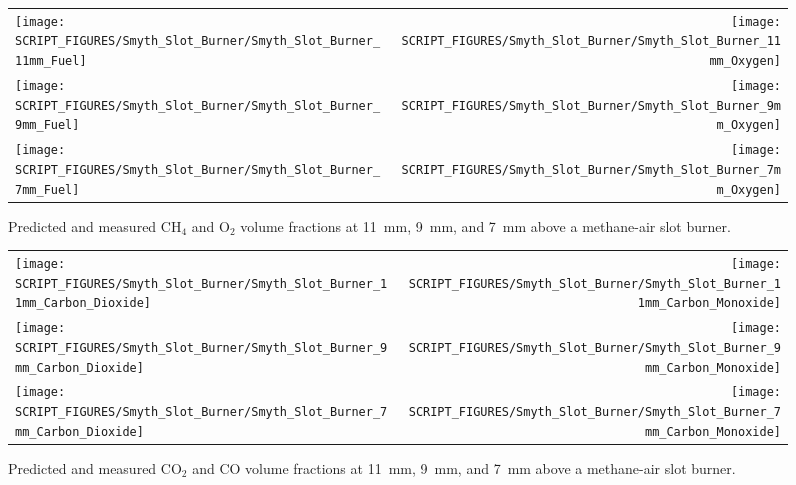 \begin{figure}[p]
\begin{tabular*}{\textwidth}{l@{\extracolsep{\fill}}r}
\texttt{[image: SCRIPT\_FIGURES/Smyth\_Slot\_Burner/Smyth\_Slot\_Burner\_11mm\_Fuel]} &
\texttt{[image: SCRIPT\_FIGURES/Smyth\_Slot\_Burner/Smyth\_Slot\_Burner\_11mm\_Oxygen]} \\
\texttt{[image: SCRIPT\_FIGURES/Smyth\_Slot\_Burner/Smyth\_Slot\_Burner\_9mm\_Fuel]} &
\texttt{[image: SCRIPT\_FIGURES/Smyth\_Slot\_Burner/Smyth\_Slot\_Burner\_9mm\_Oxygen]} \\
\texttt{[image: SCRIPT\_FIGURES/Smyth\_Slot\_Burner/Smyth\_Slot\_Burner\_7mm\_Fuel]} &
\texttt{[image: SCRIPT\_FIGURES/Smyth\_Slot\_Burner/Smyth\_Slot\_Burner\_7mm\_Oxygen]}
\end{tabular*}
\caption[CH$_4$ and O$_2$ volume fractions at 11~mm, 9~mm, and 7~mm above burner, Smyth burner]
{Predicted and measured CH$_4$ and O$_2$ volume fractions at 11~mm, 9~mm, and 7~mm above a methane-air slot burner.}
\label{Smyth_Slot_Burner_fuel_ox}
\end{figure}

\begin{figure}[p]
\begin{tabular*}{\textwidth}{l@{\extracolsep{\fill}}r}
\texttt{[image: SCRIPT\_FIGURES/Smyth\_Slot\_Burner/Smyth\_Slot\_Burner\_11mm\_Carbon\_Dioxide]} &
\texttt{[image: SCRIPT\_FIGURES/Smyth\_Slot\_Burner/Smyth\_Slot\_Burner\_11mm\_Carbon\_Monoxide]} \\
\texttt{[image: SCRIPT\_FIGURES/Smyth\_Slot\_Burner/Smyth\_Slot\_Burner\_9mm\_Carbon\_Dioxide]} &
\texttt{[image: SCRIPT\_FIGURES/Smyth\_Slot\_Burner/Smyth\_Slot\_Burner\_9mm\_Carbon\_Monoxide]} \\
\texttt{[image: SCRIPT\_FIGURES/Smyth\_Slot\_Burner/Smyth\_Slot\_Burner\_7mm\_Carbon\_Dioxide]} &
\texttt{[image: SCRIPT\_FIGURES/Smyth\_Slot\_Burner/Smyth\_Slot\_Burner\_7mm\_Carbon\_Monoxide]}
\end{tabular*}
\caption[CO$_2$ and CO volume fractions at 11~mm, 9~mm, and 7~mm above burner, Smyth burner]
{Predicted and measured CO$_2$ and CO volume fractions at 11~mm, 9~mm, and 7~mm above a methane-air slot burner.}
\label{Smyth_Slot_Burner_co_co2}
\end{figure}

